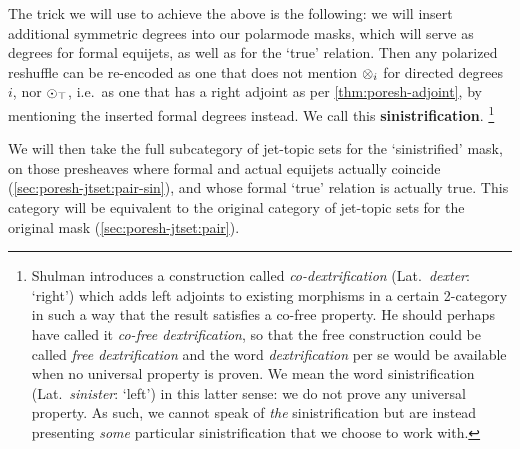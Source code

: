 \documentclass[a4paper]{memoir}
\begin{document}
{The trick we will use to achieve the above is the following: we will insert additional symmetric degrees into our polarmode masks, which will serve as degrees for formal equijets, as well as for the `true' relation.
Then any polarized reshuffle can be re-encoded as one that does not mention ${\otimes}_i$ for directed degrees $i$, nor ${\odot}_\top$, i.e.\ as one that has a right adjoint as per \cref{thm:poresh-adjoint}, by mentioning the inserted formal degrees instead.
We call this \textbf{sinistrification}.%
\footnote{Shulman \cite{matt} introduces a construction called \emph{co-dextrification} (Lat.\ \emph{dexter}: `right') which adds left adjoints to existing morphisms in a certain 2-category in such a way that the result satisfies a co-free property. He should perhaps have called it \emph{co-free dextrification}, so that the free construction could be called \emph{free dextrification} and the word \emph{dextrification} per se would be available when no universal property is proven. We mean the word sinistrification (Lat.\ \emph{sinister}: `left') in this latter sense: we do not prove any universal property. As such, we cannot speak of \emph{the} sinistrification but are instead presenting \emph{some} particular sinistrification that we choose to work with.}

We will then take the full subcategory of jet-topic sets for the `sinistrified' mask, on those presheaves where formal and actual equijets actually coincide (\cref{sec:poresh-jtset:pair-sin}), and whose formal `true' relation is actually true.
This category will be equivalent to the original category of jet-topic sets for the original mask (\cref{sec:poresh-jtset:pair}).


\bigskip

}
\end{document}
